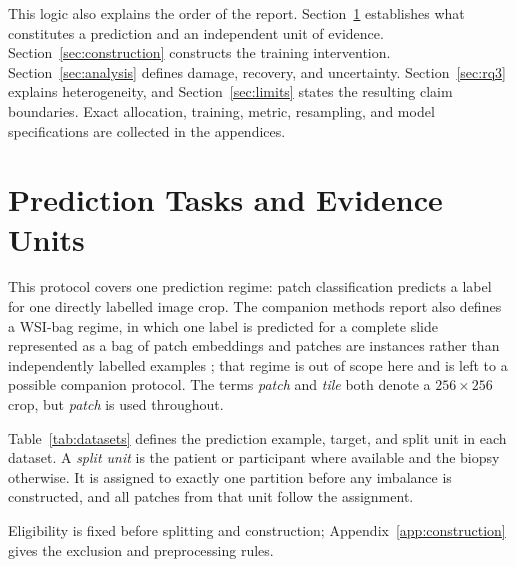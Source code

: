 \documentclass[11pt]{article}
\begin{document}
This logic also explains the order of the report. Section~\ref{sec:data} establishes what constitutes a prediction and an independent unit of evidence. Section~\ref{sec:construction} constructs the training intervention. Section~\ref{sec:analysis} defines damage, recovery, and uncertainty. Section~\ref{sec:rq3} explains heterogeneity, and Section~\ref{sec:limits} states the resulting claim boundaries. Exact allocation, training, metric, resampling, and model specifications are collected in the appendices.

\section{Prediction Tasks and Evidence Units}
\label{sec:data}
This protocol covers one prediction regime: patch classification predicts a label for one directly labelled image crop. The companion methods report also defines a WSI-bag regime, in which one label is predicted for a complete slide represented as a bag of patch embeddings and patches are instances rather than independently labelled examples \citep{queisler2026imbalanceMethods}; that regime is out of scope here and is left to a possible companion protocol. The terms \emph{patch} and \emph{tile} both denote a $256\times256$ crop, but \emph{patch} is used throughout.

Table~\ref{tab:datasets} defines the prediction example, target, and split unit in each dataset. A \emph{split unit} is the patient or participant where available and the biopsy otherwise. It is assigned to exactly one partition before any imbalance is constructed, and all patches from that unit follow the assignment.

Eligibility is fixed before splitting and construction; Appendix~\ref{app:construction} gives the exclusion and preprocessing rules.
\end{document}
